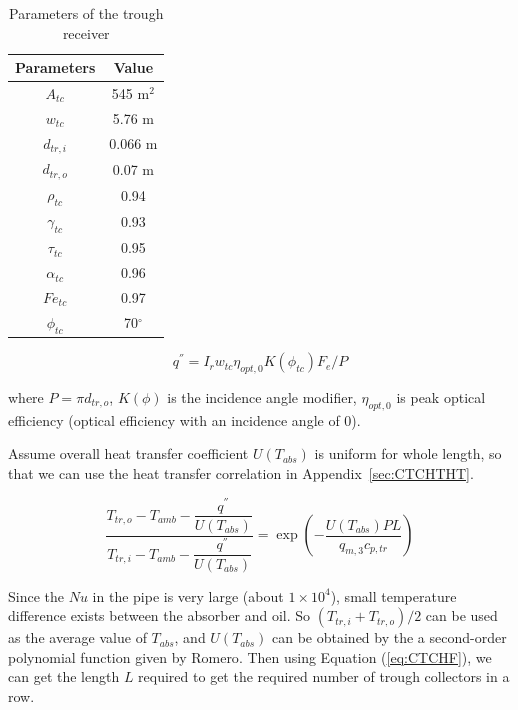 \documentclass{article}
\begin{document}
\begin{table}[htbp]
	\caption{Parameters of the trough receiver}
	\begin{center}
	\begin{tabular}{cc}
		\toprule
		Parameters	&	Value\\
		\midrule
		$A_{tc}$	&	545 m$^2$\\
		$w_{tc}$&	5.76 m\\
		$d_{tr,i}$		&	0.066 m\\
		$d_{tr,o}$	&	0.07 m\\
		$\rho_{tc}$		&	0.94\\
		$\gamma_{tc}$	&	0.93\\
		$\tau_{tc}$		&	0.95\\
		$\alpha_{tc}$	&	0.96\\
		$Fe_{tc}$		&	0.97\\
		$\phi_{tc}$	&	70$^\circ$\\
		\bottomrule
	\end{tabular}
	\end{center}
	\label{tab:tc}
\end{table}

\begin{equation*}
	q^{''}=I_rw_{tc}\eta_{opt,0}K(\phi_{tc})F_{e}/P
\end{equation*}

where $P=\pi{}d_{tr,o}$, $K(\phi)$ is the incidence angle modifier, $\eta_{opt,0}$
is peak optical efficiency (optical efficiency with an incidence angle of 0).

Assume overall heat transfer coefficient $U(T_{abs})$ is uniform for whole length, so that we can use the heat transfer correlation in Appendix~\ref{sec:CTCHTHT}.

\begin{equation}
	\frac{T_{tr,o}-T_{amb}-\dfrac{q^{''}}{U(T_{abs})}}{T_{tr,i}-T_{amb}-\dfrac{q^{''}}{U(T_{abs})}}=\exp(-\frac{U(T_{abs})PL}{q_{m,3}c_{p,tr}})\label{eq:CTCHF}
\end{equation}

Since the $Nu$ in the pipe is very large (about $1\times10^4$), small temperature difference exists between the absorber and oil. So $(T_{tr,i}+T_{tr,o})/2$ can be used as the average value of $T_{abs}$, and $U(T_{abs})$ can be obtained by the a second-order polynomial function given by Romero\cite{Romero2007}. Then using Equation (\ref{eq:CTCHF}), we can get the length $L$ required to get the required number of trough collectors in a row.
\end{document}
